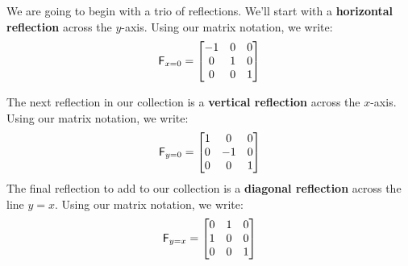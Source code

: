 \documentclass{ximera}
\begin{document}
We are going to begin with a trio of reflections. We'll start with a
\textbf{horizontal reflection} across the $y$-axis.  Using
our matrix notation, we write:
\[
\mathsf{F}_{x=0} =
\begin{bmatrix}
-1 & 0 & 0\\
 0 & 1 & 0\\
 0 & 0 & 1
\end{bmatrix}
\]

The next reflection in our collection is a \textbf{vertical
  reflection}
across the $x$-axis.  Using our matrix notation, we write:
\[
\mathsf{F}_{y=0} =
\begin{bmatrix}
1 &  0 & 0\\
0 & -1 & 0\\
0 &  0 & 1
\end{bmatrix}
\]
The final reflection to add to our collection is a \textbf{diagonal
  reflection}
across the line $y=x$.  Using our matrix notation, we write:
\[
\mathsf{F}_{y=x} =
\begin{bmatrix}
0 & 1 & 0\\
1 & 0 & 0\\
0 & 0 & 1
\end{bmatrix}
\]
\end{document}
